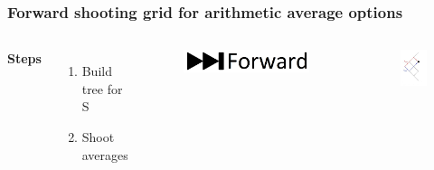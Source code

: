 \documentclass{beamer}
\begin{document}
\begin{frame}[noframenumbering]
\frametitle{Forward shooting grid for arithmetic average options}
\begin{columns}[c] %

\textbf{Steps}
\begin{enumerate}
\item Build tree for S
\item Shoot averages
\end{enumerate}

\begin{figure}
	\includegraphics[scale=0.1]{forward}
\end{figure}
\begin{figure}
	\includegraphics[scale=0.5]{average_path}
\end{figure}

\end{columns}
\end{frame}
\end{document}
